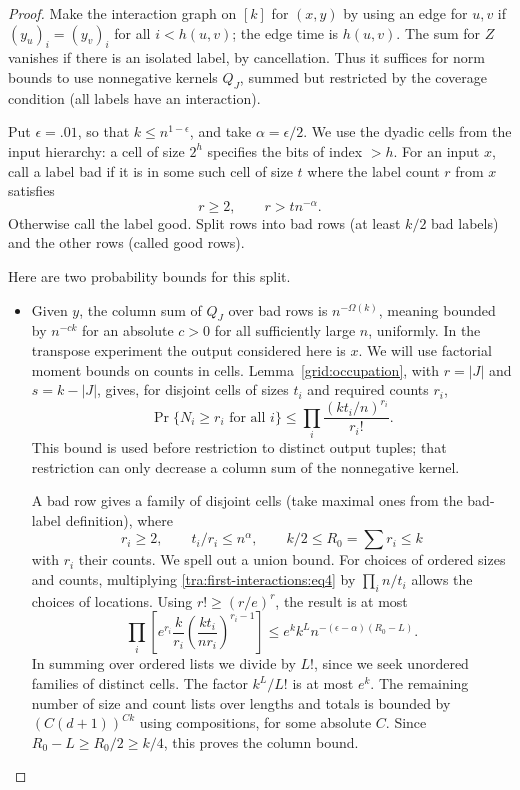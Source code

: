 \begin{proof}
Make the interaction graph on \([k]\) for \((x,y)\) by using an edge for \(u,v\) if \((y_u)_i=(y_v)_i\) for all \(i<h(u,v)\); the edge time is \(h(u,v)\). The sum for \(Z\) vanishes if there is an isolated label, by cancellation. Thus it suffices for norm bounds to use nonnegative kernels \(Q_J\), summed but restricted by the coverage condition (all labels have an interaction).

\label{tra:first-interactions:bad-cell-factorial-moments}
Put \(\epsilon=.01\), so that \(k\le n^{1-\epsilon}\), and take \(\alpha=\epsilon/2\). We use the dyadic cells from the input hierarchy: a cell of size \(2^h\) specifies the bits of index \(>h\). For an input \(x\), call a label bad if it is in some such cell of size \(t\) where the label count \(r\) from \(x\) satisfies
\[
                            r\ge 2,\qquad r> t n^{-\alpha}.
\]
Otherwise call the label good. Split rows into bad rows (at least \(k/2\) bad labels) and the other rows (called good rows).

Here are two probability bounds for this split.

\begin{itemize}
\item Given \(y\), the column sum of \(Q_J\) over bad rows is \(n^{-\Omega(k)}\), meaning bounded by \(n^{-c k}\) for an absolute \(c>0\) for all sufficiently large \(n\), uniformly. In the transpose experiment the output considered here is \(x\). We will use factorial moment bounds on counts in cells. Lemma~\ref{grid:occupation}, with $r=|J|$ and $s=k-|J|$,
gives, for disjoint cells of sizes $t_i$ and required counts $r_i$,
\begin{equation}\label{tra:first-interactions:eq4}
 \Pr\{N_i\ge r_i\text{ for all }i\}
 \le\prod_i\frac{(kt_i/n)^{r_i}}{r_i!}.
\end{equation}
This bound is used before restriction to distinct output tuples;
that restriction can only decrease a column sum of the nonnegative
kernel.

  A bad row gives a family of disjoint cells (take maximal ones from the bad-label definition), where
  \[
                  r_i\ge 2,\qquad t_i/r_i\le n^\alpha,\qquad
                           k/2\le R_0=\sum r_i\le k
  \]
  with \(r_i\) their counts. We spell out a union bound. For choices of ordered sizes and counts, multiplying \eqref{tra:first-interactions:eq4} by \(\prod_i n/t_i\) allows the choices of locations. Using \(r!\ge(r/e)^r\), the result is at most
  \[
        \prod_i \left[e^{r_i}\frac{k}{r_i}
                   \left(\frac{k t_i}{n r_i}\right)^{r_i-1}\right]
               \le e^k k^L n^{-(\epsilon-\alpha)(R_0-L)}.
  \]
  In summing over ordered lists we divide by \(L!\), since we seek unordered families of distinct cells. The factor \(k^L/L!\) is at most \(e^k\). The remaining number of size and count lists over lengths and totals is bounded by \((C(d+1))^{Ck}\) using compositions, for some absolute \(C\). Since \(R_0-L\ge R_0/2\ge k/4\), this proves the column bound.
\end{itemize}


\end{proof}
